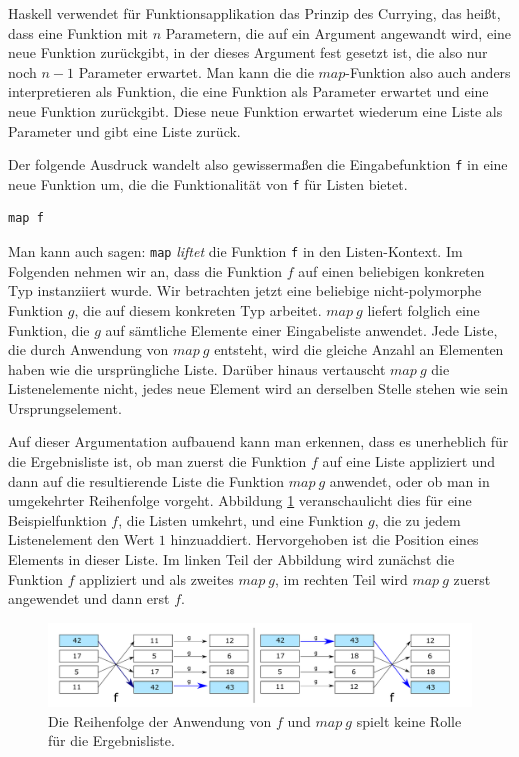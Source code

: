 Haskell verwendet für Funktionsapplikation das Prinzip des Currying, das heißt, dass eine Funktion mit $n$ Parametern, die auf ein
Argument angewandt wird, eine neue Funktion zurückgibt, in der dieses Argument fest gesetzt ist, die also nur noch $n-1$ Parameter erwartet. 
Man kann die die $map$-Funktion also auch anders interpretieren als Funktion, die eine Funktion als Parameter erwartet und eine
neue Funktion zurückgibt. Diese neue Funktion erwartet wiederum eine Liste als Parameter und gibt eine Liste zurück.

Der folgende Ausdruck wandelt also gewissermaßen die Eingabefunktion \texttt{f} in eine neue Funktion um, die die Funktionalität von
\texttt{f} für Listen bietet.

\begin{verbatim}
map f
\end{verbatim}

Man kann auch sagen: \texttt{map} \textit{liftet} die Funktion \texttt{f} in den Listen-Kontext.
Im Folgenden nehmen wir an, dass die Funktion $f$ auf einen beliebigen konkreten Typ instanziiert wurde.
Wir betrachten jetzt eine beliebige nicht-polymorphe Funktion $g$, die auf diesem konkreten Typ arbeitet. $map\ g$ liefert folglich eine Funktion,
die $g$ auf sämtliche Elemente einer Eingabeliste
anwendet. Jede Liste, die durch Anwendung von $map\ g$ entsteht, wird die gleiche Anzahl an Elementen haben wie die ursprüngliche Liste.
Darüber hinaus vertauscht $map\ g$ die Listenelemente nicht, jedes neue Element wird an derselben Stelle stehen wie
sein Ursprungselement.

Auf dieser Argumentation aufbauend kann man erkennen, dass es unerheblich für die Ergebnisliste ist, ob man zuerst die
Funktion $f$ auf eine Liste appliziert und dann auf die resultierende Liste die Funktion $map\ g$ anwendet, oder ob man
in umgekehrter Reihenfolge vorgeht. Abbildung \ref{fig:fmapg} veranschaulicht dies für eine Beispielfunktion $f$, die Listen
umkehrt, und eine Funktion $g$, die zu jedem Listenelement den Wert $1$ hinzuaddiert. Hervorgehoben ist die Position
eines Elements in dieser Liste. Im linken Teil der Abbildung wird zunächst die Funktion $f$ appliziert und als zweites
$map\ g$, im rechten Teil wird $map\ g$ zuerst angewendet und dann erst $f$.

\begin{figure}[ht]
\centering
\includegraphics[width=430px]{fmapg}
\caption{Die Reihenfolge der Anwendung von $f$ und $map\ g$ spielt keine Rolle für die Ergebnisliste.}
\label{fig:fmapg}
\end{figure}


